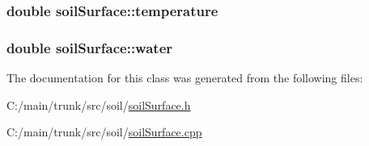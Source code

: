 \hypertarget{classsoil_surface_a3b9e9759bccf43a4fb6a971c0cff4874}{
\subsubsection[{temperature}]{\setlength{\rightskip}{0pt plus 5cm}double {\bf soilSurface::temperature}}}
\label{classsoil_surface_a3b9e9759bccf43a4fb6a971c0cff4874}
\hypertarget{classsoil_surface_ad980e7ed17d0b8284082728a87f95983}{
\subsubsection[{water}]{\setlength{\rightskip}{0pt plus 5cm}double {\bf soilSurface::water}}}
\label{classsoil_surface_ad980e7ed17d0b8284082728a87f95983}


The documentation for this class was generated from the following files:\begin{DoxyCompactItemize}
\item 
C:/main/trunk/src/soil/\hyperlink{soil_surface_8h}{soilSurface.h}\item 
C:/main/trunk/src/soil/\hyperlink{soil_surface_8cpp}{soilSurface.cpp}\end{DoxyCompactItemize}
